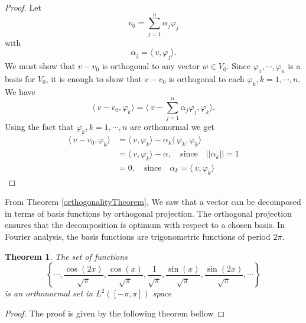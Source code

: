 \documentclass[11pt, oneside]{article}   	%
\newtheorem{theorem}{Theorem}
\newtheorem{proof}{Proof}
\begin{document}
\begin{proof}
Let 
\begin{equation}
v_{0} = \sum_{j=1}^{n}\alpha_{j}\varphi_{j} \nonumber
\end{equation}
with 
\begin{equation}
\alpha_{j}  = \langle\ v,\varphi_{j} \rangle.  \nonumber
\end{equation}
We must show that $v-v_{0}$ is orthogonal to any vector $w \in V_{0}$. Since $\varphi_{1}, \cdots, \varphi_{n}$ is a basis for $V_{0}$, it is enough to show that $v-v_{0}$ is orthogonal to each 
$\varphi_{k}, k = 1, \cdots, n$.
\justify
We have
\begin{equation}
\langle\ v-v_{0},\varphi_{k} \rangle = \langle\ v-\sum_{j=1}^{n}\alpha_{j}\varphi_{j},\varphi_{k} \rangle.
\end{equation}
Using the fact that $\varphi_{k}, k = 1, \cdots, n$ are orthonormal we get
\begin{equation}
\begin{split}
\langle\ v-v_{0},\varphi_{k} \rangle &= \langle\ v,\varphi_{k} \rangle -\alpha_{k}\langle\ \varphi_{k},\varphi_{k} \rangle \\
&=\langle\ v,\varphi_{k} \rangle -\alpha, \quad \text{since} \quad || \alpha_{k}|| = 1\\
&=0, \quad \text{since} \quad \alpha_{k} = \langle\ v,\varphi_{k} \rangle \nonumber
\end{split}
\end{equation}
\end{proof}

\justify
From Theorem \ref{orthogonalityTheorem}, We saw that a vector can be decomposed in terms of basis functions by orthogonal projection. The orthogonal projection ensures that the decomposition is optimum with respect to a chosen basis. In Fourier analysis, the basis functions are trigonometric functions of period $2\pi$.
\begin{theorem}
The set of functions 
\begin{equation}
\left \{ \cdots, \frac{\cos(2x)}{\sqrt{\pi}},\frac{\cos(x)}{\sqrt{\pi}},\frac{1}{\sqrt{\pi}}, \frac{\sin(x)}{\sqrt{\pi}},\frac{\sin(2x)}{\sqrt{\pi}},\cdots  \right \}
\end{equation}
is an orthonormal set in $L^{2}([-\pi,\pi])$ space
\end{theorem}
\begin{proof}
The proof is given by the following theorem bellow
\end{proof}
\end{document}
